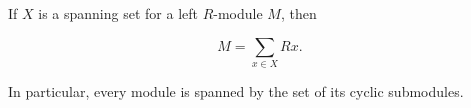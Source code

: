 If $X$ is a spanning set for a left $R$-module $M$, then

$$M = \sum_{x \in X} R x.$$

In particular, every module is spanned by the set of its cyclic submodules.
